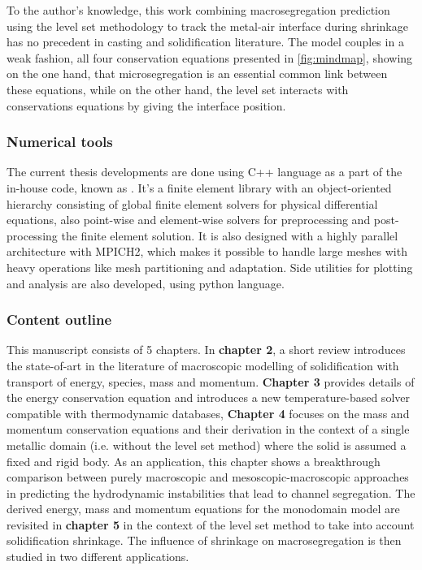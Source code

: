 To the author's knowledge, this work 
combining macrosegregation prediction using the level set methodology to track the metal-air interface during 
shrinkage has no precedent in casting and solidification literature. The model couples in a weak fashion, all four
conservation equations presented in \cref{fig:mindmap}, showing on the one hand, that microsegregation is an essential 
common link between these equations, while on the other hand, the level set interacts with conservations equations by
giving the interface position. 
%
\subsubsection{Numerical tools}
The current thesis developments are done using C++ language as a part of the
in-house code, known as \cimlib \citep{digonnet_cimlib:_2007,mesri_advanced_2009}. It's a finite element library with an object-oriented hierarchy
consisting of global finite element solvers for physical differential equations, also point-wise and element-wise solvers for 
preprocessing and post-processing the finite element solution. It is also designed with a highly parallel architecture with MPICH2, which makes it possible
to handle large meshes with heavy operations like mesh partitioning and adaptation. Side utilities for plotting and analysis
are also developed, using python language.

\subsubsection{Content outline}
This manuscript consists of 5 chapters. In \textbf{chapter 2}, a short review introduces the state-of-art in the literature of 
macroscopic modelling of solidification with transport of energy, species, mass and momentum. \textbf{Chapter 3} provides details
of the energy conservation equation and introduces a new temperature-based solver compatible with thermodynamic databases,
\textbf{Chapter 4} focuses on the mass and momentum conservation equations 
and their derivation in the context of a single metallic domain (i.e. without 
the level set method) where the solid is assumed a fixed and rigid body. As an 
application, this chapter shows a breakthrough comparison between purely macroscopic 
and mesoscopic-macroscopic approaches in predicting the hydrodynamic instabilities 
that lead to channel segregation.
The derived energy, mass and momentum equations for the monodomain model are revisited 
in \textbf{chapter 5} in the context of the level set method to take into account solidification shrinkage.
The influence of shrinkage on macrosegregation is then studied in two different applications.

